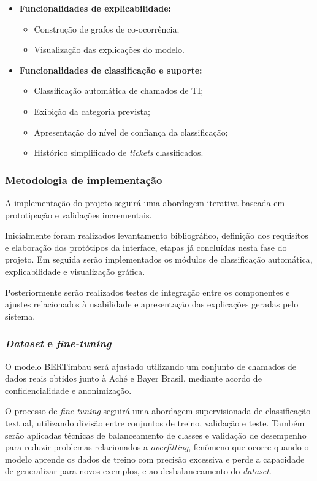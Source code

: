 \documentclass[
    12pt,                %
    openright,           %
    oneside,             %
    a4paper,             %
    english,             %
    brazil               %
]{abntex2}
\begin{document}
\begin{itemize}
    \item \textbf{Funcionalidades de explicabilidade:}
    \begin{itemize}
        \item Construção de grafos de co-ocorrência;
        \item Visualização das explicações do modelo.
    \end{itemize}
    \item \textbf{Funcionalidades de classificação e suporte:}
    \begin{itemize}
        \item Classificação automática de chamados de TI;
        \item Exibição da categoria prevista;
        \item Apresentação do nível de confiança da classificação;
        \item Histórico simplificado de \textit{tickets} classificados.
    \end{itemize}
\end{itemize}

\subsubsection{Metodologia de implementação}

A implementação do projeto seguirá uma abordagem iterativa baseada em prototipação e validações incrementais.

Inicialmente foram realizados levantamento bibliográfico, definição dos requisitos e elaboração dos protótipos da interface, etapas já concluídas nesta fase do projeto. Em seguida serão implementados os módulos de classificação automática, explicabilidade e visualização gráfica.

Posteriormente serão realizados testes de integração entre os componentes e ajustes relacionados à usabilidade e apresentação das explicações geradas pelo sistema.

\subsubsection{\textit{Dataset} e \textit{fine-tuning}}

O modelo BERTimbau será ajustado utilizando um conjunto de chamados de dados reais obtidos junto à Aché e Bayer Brasil, mediante acordo de confidencialidade e anonimização.

O processo de \textit{fine-tuning} seguirá uma abordagem supervisionada de classificação textual, utilizando divisão entre conjuntos de treino, validação e teste. Também serão aplicadas técnicas de balanceamento de classes e validação de desempenho para reduzir problemas relacionados a \textit{overfitting}, fenômeno que ocorre quando o modelo aprende os dados de treino com precisão excessiva e perde a capacidade de generalizar para novos exemplos, e ao desbalanceamento do \textit{dataset}.
\end{document}
